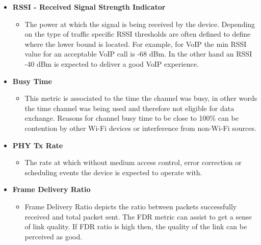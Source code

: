 \begin{itemize}
	\item \textbf{RSSI - Received Signal Strength Indicator}
	\begin{itemize}
		\item The power at which the signal is being received by the device. Depending on the type of traffic specific RSSI thresholds are often defined to define where the lower bound is located. For example, for VoIP the min RSSI value for an acceptable VoIP call is -68 dBm. In the other hand an RSSI -40 dBm is expected to deliver a good VoIP experience.
	\end{itemize}
	\hfill \break
	\item \textbf{Busy Time}
	\begin{itemize}
		\item This metric is associated to the time the channel was busy, in other words the time channel was being used and therefore not eligible for data exchange. Reasons for channel busy time to be close to 100\% can be contention by other Wi-Fi devices or interference from non-Wi-Fi sources.
	\end{itemize}
	
	\item \textbf{PHY Tx Rate}
	\begin{itemize}
		\item 	The rate at which without medium access control, error correction or scheduling events the device is expected to operate with.
	\end{itemize}
	
	\item \textbf{Frame Delivery Ratio}
	\begin{itemize}
		\item Frame Delivery Ratio depicts the ratio between packets successfully received and total packet sent. The FDR metric can assist to get a sense of link quality. If FDR ratio is high then, the quality of the link can be perceived as good.
	\end{itemize}

\end{itemize}

